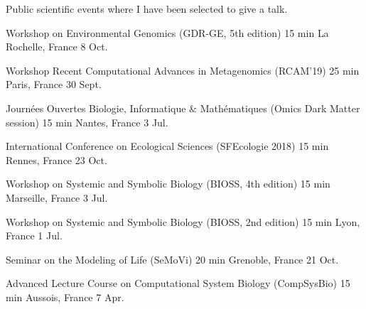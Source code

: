 
\begin{small}
Public scientific events where I have been selected to give a talk.
\end{small}


\begin{cvhonors}
  \cvhonor
    {Workshop on Environmental Genomics (GDR-GE, 5th edition)} %
    {15 min} %
    {La Rochelle, France} %
    {8 Oct.} %
    
  \cvhonor
    {Workshop Recent Computational Advances in Metagenomics (RCAM'19)} %
    {25 min} %
    {Paris, France} %
    {30 Sept.} %

  \cvhonor
    {Journées Ouvertes Biologie, Informatique \& Mathématiques (Omics Dark Matter session)}
    {15 min} %
    {Nantes, France} %
    {3 Jul.} %
    
\end{cvhonors}


\begin{cvhonors}

  \cvhonor
    {International Conference on Ecological Sciences (SFEcologie 2018)} %
    {15 min} %
    {Rennes, France} %
    {23 Oct.} %

  \cvhonor
    {Workshop on Systemic and Symbolic Biology (BIOSS, 4th edition)} %
    {15 min} %
    {Marseille, France} %
    {3 Jul.} %

\end{cvhonors}


\begin{cvhonors}

  \cvhonor
    {Workshop on Systemic and Symbolic Biology (BIOSS, 2nd edition)} %
    {15 min} %
    {Lyon, France} %
    {1 Jul.} %

\end{cvhonors}


\begin{cvhonors}

  \cvhonor
    {Seminar on the Modeling of Life (SeMoVi)} %
    {20 min} %
    {Grenoble, France} %
    {21 Oct.} %

  \cvhonor
    {Advanced Lecture Course on Computational System Biology (CompSysBio)} %
    {15 min} %
    {Aussois, France} %
    {7 Apr.} %
    
\end{cvhonors}